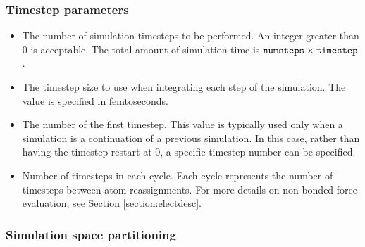\subsubsection{Timestep parameters}

\begin{itemize}
\item
{}
{\label{param:numsteps}
The number of simulation timesteps to be performed.  
An integer greater than 0 is acceptable.  
The total amount of simulation 
time is $\mbox{{\tt numsteps}} \times \mbox{{\tt timestep}}$.}

\item
{}
{The timestep size to use when integrating each step of the simulation.  
The value is specified in femtoseconds.}

\item
{}
{The number of the first timestep.  This value is typically used only 
when a simulation is a continuation of a previous simulation.  In this 
case, rather than having the timestep restart at 0, a specific timestep 
number can be specified.}

\item
{}
{Number of timesteps in each cycle.  Each cycle represents the number 
of timesteps between atom reassignments.
For more details on non-bonded force evaluation, see
Section \ref{section:electdesc}.}


\end{itemize}

\subsubsection{Simulation space partitioning}


